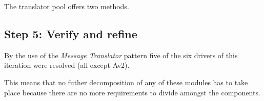 \npar The translator pool offers two methods.


\subsection{Step 5: Verify and refine}
\label{add:it2/verification}

\npar By the use of the \emph{Message Translator} pattern five of the six
drivers of this iteration were resolved (all except Av2). 


\npar This means that no futher decomposition of any of these modules has to
take place because there are no more requirements to divide amongst the
components. 
